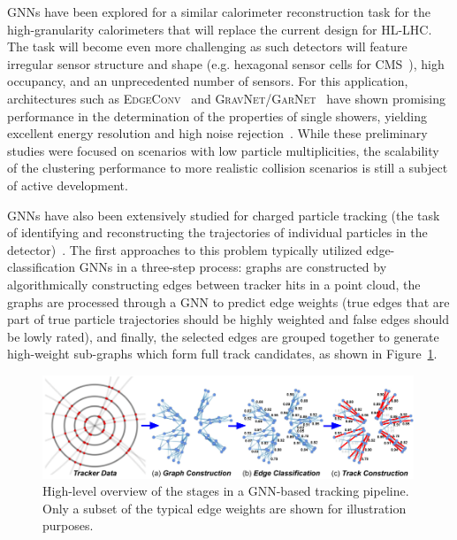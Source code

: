 GNNs have been explored for a similar calorimeter reconstruction task for the high-granularity calorimeters that will replace the current design for HL-LHC. 
The task will become even more challenging as such detectors will feature irregular sensor structure and shape (e.g. hexagonal sensor cells for CMS~\cite{collaboration:2017gbu}), high occupancy, and an unprecedented number of sensors. For this application, architectures such as \textsc{EdgeConv}~\cite{DBLP:abs-1801-07829} and \textsc{GravNet/GarNet}~\cite{Qasim:2019otl} have shown promising performance in the determination of the properties of single showers, yielding  excellent energy resolution and high noise rejection~\cite{Ju:2020xty}. 
While these preliminary studies were focused on scenarios with low particle multiplicities, the scalability of the clustering performance to more realistic collision scenarios is still a subject of active development.


GNNs have also been extensively studied for charged particle tracking (the task of identifying and reconstructing the trajectories of individual particles in the detector)~\cite{exatrk_19,duarte_vlimant, heptrkx,dl_tracking}. The first approaches to this problem typically utilized edge-classification GNNs in a three-step process: graphs are constructed by algorithmically constructing edges between tracker hits in a point cloud, the graphs are processed through a GNN to predict edge weights (true edges that are part of true particle trajectories should be highly weighted and false edges should be lowly rated), and finally, the selected edges are grouped together to generate high-weight sub-graphs which form full track candidates, as shown in Figure~\ref{fig:gnn_steps}.
\begin{figure}[ht!p]
    \centering
    \includegraphics[width=0.99\textwidth]{figures/GNN_steps.png}
    \caption{High-level overview of the stages in a GNN-based tracking pipeline. Only a subset of the typical edge weights are shown for illustration purposes.}
    \label{fig:gnn_steps}
\end{figure}

